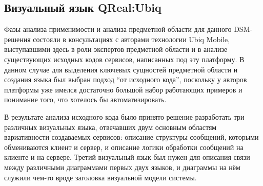 \subsection{Визуальный язык QReal:Ubiq}
Фазы анализа применимости и анализа предметной области для данного DSM-решения состояли 
в консультациях с авторами технологии Ubiq Mobile, выступавшими здесь в роли экспертов 
предметной области и в анализе существующих исходных кодов сервисов, написанных под 
эту платформу. В данном случае для выделения ключевых сущностей предметной области и 
создания языка был выбран подход "`от исходного кода"', поскольку у авторов платформы 
уже имелся достаточно большой набор работающих примеров и понимание того, что хотелось 
бы автоматизировать.

В результате анализа исходного кода было принято решение разработать три различных 
визуальных языка, отвечавших двум основным областям вариативности создаваемых сервисов: 
описание структуры сообщений, которыми обмениваются клиент и сервер, и описание логики 
обработки сообщений на клиенте и на сервере. Третий визуальный язык был нужен для 
описания связи между различными диаграммами первых двух языков, и диаграммы на нём 
служили чем-то вроде заголовка визуальной модели системы. 

